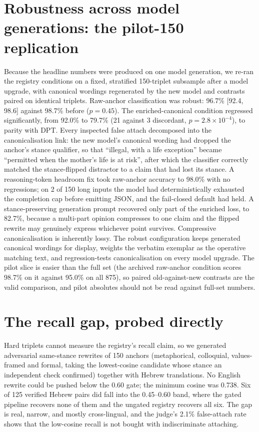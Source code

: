 \documentclass{article}
\begin{document}
\section{Robustness across model generations: the pilot-150 replication}
\label{app:pilot}
Because the headline numbers were produced on one model generation, we re-ran the registry conditions on a fixed, stratified 150-triplet subsample after a model upgrade, with canonical wordings regenerated by the new model and contrasts paired on identical triplets. Raw-anchor classification was robust: 96.7\% [92.4, 98.6] against 98.7\% before ($p=0.45$). The enriched-canonical condition regressed significantly, from 92.0\% to 79.7\% (21 against 3 discordant, $p=2.8\times10^{-4}$), to parity with DPT. Every inspected false attach decomposed into the canonicalisation link: the new model's canonical wording had dropped the anchor's stance qualifier, so that ``illegal, with a life exception'' became ``permitted when the mother's life is at risk'', after which the classifier correctly matched the stance-flipped distractor to a claim that had lost its stance. A reasoning-token headroom fix took raw-anchor accuracy to 98.0\% with no regressions; on 2 of 150 long inputs the model had deterministically exhausted the completion cap before emitting JSON, and the fail-closed default had held. A stance-preserving generation prompt recovered only part of the enriched loss, to 82.7\%, because a multi-part opinion compresses to one claim and the flipped rewrite may genuinely express whichever point survives. Compressive canonicalisation is inherently lossy. The robust configuration keeps generated canonical wordings for display, weights the verbatim exemplar as the operative matching text, and regression-tests canonicalisation on every model upgrade. The pilot slice is easier than the full set (the archived raw-anchor condition scores 98.7\% on it against 95.0\% on all 875), so paired old-against-new contrasts are the valid comparison, and pilot absolutes should not be read against full-set numbers.

\section{The recall gap, probed directly}
\label{sec:recallgap}
Hard triplets cannot measure the registry's recall claim, so we generated adversarial same-stance rewrites of 150 anchors (metaphorical, colloquial, values-framed and formal, taking the lowest-cosine candidate whose stance an independent check confirmed) together with Hebrew translations. No English rewrite could be pushed below the 0.60 gate; the minimum cosine was 0.738. Six of 125 verified Hebrew pairs did fall into the 0.45--0.60 band, where the gated pipeline recovers none of them and the ungated registry recovers all six. The gap is real, narrow, and mostly cross-lingual, and the judge's 2.1\% false-attach rate shows that the low-cosine recall is not bought with indiscriminate attaching.
\end{document}

